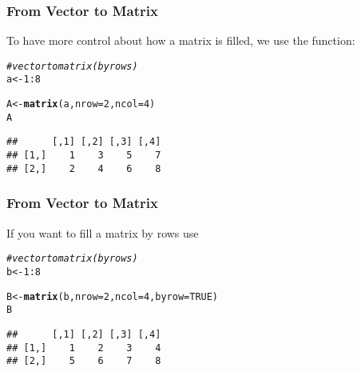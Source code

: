 \documentclass[12pt]{beamer}\usepackage[]{graphicx}\usepackage[]{color}
\makeatletter
\newcommand{\hlnum}[1]{\textcolor[rgb]{0.686,0.059,0.569}{#1}}%
\newcommand{\hlcom}[1]{\textcolor[rgb]{0.678,0.584,0.686}{\textit{#1}}}%
\newcommand{\hlopt}[1]{\textcolor[rgb]{0,0,0}{#1}}%
\newcommand{\hlstd}[1]{\textcolor[rgb]{0.345,0.345,0.345}{#1}}%
\newcommand{\hlkwb}[1]{\textcolor[rgb]{0.69,0.353,0.396}{#1}}%
\newcommand{\hlkwc}[1]{\textcolor[rgb]{0.333,0.667,0.333}{#1}}%
\newcommand{\hlkwd}[1]{\textcolor[rgb]{0.737,0.353,0.396}{\textbf{#1}}}%
\newenvironment{kframe}{%
 \def\at@end@of@kframe{}%
 \ifinner\ifhmode%
  \def\at@end@of@kframe{\end{minipage}}%
  \begin{minipage}{\columnwidth}%
 \fi\fi%
 \def\FrameCommand##1{\hskip\@totalleftmargin \hskip-\fboxsep
 \colorbox{shadecolor}{##1}\hskip-\fboxsep
     \hskip-\linewidth \hskip-\@totalleftmargin \hskip\columnwidth}%
 \MakeFramed {\advance\hsize-\width
   \@totalleftmargin\z@ \linewidth\hsize
   \@setminipage}}%
 {\par\unskip\endMakeFramed%
 \at@end@of@kframe}
\newenvironment{knitrout}{}{} %
\makeatother
\begin{document}

\begin{frame}[fragile]
\frametitle{From Vector to Matrix}

To have more control about how a matrix is filled,
we use the  function:
\begin{knitrout}\footnotesize
{}\color{fgcolor}\begin{kframe}
\begin{alltt}
\hlcom{# vector to matrix (by rows)}
\hlstd{a} \hlkwb{<-} \hlnum{1}\hlopt{:}\hlnum{8}

\hlstd{A} \hlkwb{<-} \hlkwd{matrix}\hlstd{(a,} \hlkwc{nrow} \hlstd{=} \hlnum{2}\hlstd{,} \hlkwc{ncol} \hlstd{=} \hlnum{4}\hlstd{)}
\hlstd{A}
\end{alltt}
\begin{verbatim}
##      [,1] [,2] [,3] [,4]
## [1,]    1    3    5    7
## [2,]    2    4    6    8
\end{verbatim}
\end{kframe}
\end{knitrout}

\end{frame}


\begin{frame}[fragile]
\frametitle{From Vector to Matrix}

If you want to fill a matrix by rows use 
\begin{knitrout}\footnotesize
{}\color{fgcolor}\begin{kframe}
\begin{alltt}
\hlcom{# vector to matrix (by rows)}
\hlstd{b} \hlkwb{<-} \hlnum{1}\hlopt{:}\hlnum{8}

\hlstd{B} \hlkwb{<-} \hlkwd{matrix}\hlstd{(b,} \hlkwc{nrow} \hlstd{=} \hlnum{2}\hlstd{,} \hlkwc{ncol} \hlstd{=} \hlnum{4}\hlstd{,} \hlkwc{byrow} \hlstd{=} \hlnum{TRUE}\hlstd{)}
\hlstd{B}
\end{alltt}
\begin{verbatim}
##      [,1] [,2] [,3] [,4]
## [1,]    1    2    3    4
## [2,]    5    6    7    8
\end{verbatim}
\end{kframe}
\end{knitrout}

\end{frame}
\end{document}

